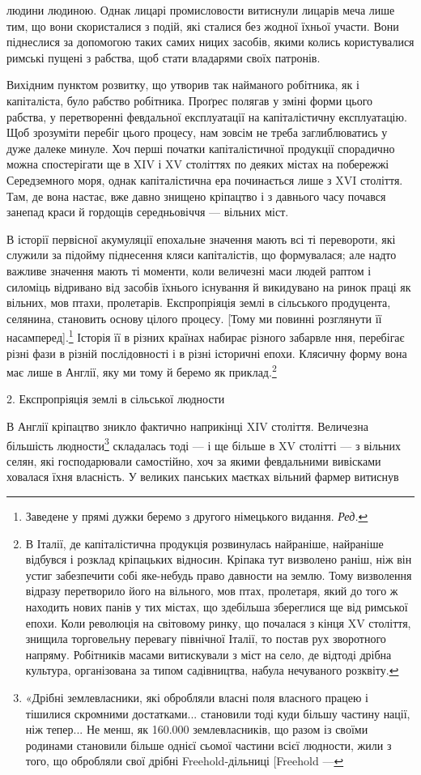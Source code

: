 людини людиною. Однак лицарі промисловости витиснули лицарів
меча лише тим, що вони скористалися з подій, які сталися
без жодної їхньої участи. Вони піднеслися за допомогою таких
самих ницих засобів, якими колись користувалися римські пущені
з рабства, щоб стати владарями своїх патронів.

Вихідним пунктом розвитку, що утворив так найманого робітника,
як і капіталіста, було рабство робітника. Проґрес полягав
у зміні форми цього рабства, у перетворенні февдальної експлуатації
на капіталістичну експлуатацію. Щоб зрозуміти перебіг
цього процесу, нам зовсім не треба заглиблюватись у дуже
далеке минуле. Хоч перші початки капіталістичної продукції
спорадично можна спостерігати ще в XIV і XV століттях по
деяких містах на побережжі Середземного моря, однак капіталістична
ера починається лише з XVI століття. Там, де вона настає,
вже давно знищено кріпацтво і з давнього часу почався
занепад краси й гордощів середньовіччя — вільних міст.

В історії первісної акумуляції епохальне значення мають всі
ті перевороти, які служили за підойму піднесення кляси капіталістів,
що формувалася; але надто важливе значення мають
ті моменти, коли величезні маси людей раптом і силоміць відривано
від засобів їхнього існування й викидувано на ринок праці
як вільних, мов птахи, пролетарів. Експропріяція землі в сільського
продуцента, селянина, становить основу цілого процесу.
[Тому ми повинні розглянути її насамперед].\footnote*{
Заведене у прямі дужки беремо з другого німецького видання. \emph{Ред.}
} Історія її в
різних країнах набирає різного забарвле ння, перебігає різні
фази в різній послідовності і в різні історичні епохи. Клясичну
форму вона має лише в Англії, яку ми тому й беремо як приклад.\footnote{
В Італії, де капіталістична продукція розвинулась найраніше,
найраніше відбувся і розклад кріпацьких відносин. Кріпака тут визволено
раніш, ніж він устиг забезпечити собі яке-небудь право давности на
землю. Тому визволення відразу перетворило його на вільного, мов
птах, пролетаря, який до того ж находить нових панів у тих містах, що
здебільша збереглися ще від римської епохи. Коли революція на світовому
ринку, що почалася з кінця XV століття, знищила торговельну
перевагу північної Італії, то постав рух зворотного напряму. Робітників
масами витискували з міст на село, де відтоді дрібна культура, організована
за типом садівництва, набула нечуваного розквіту.
}

2. Експропріяція землі в сільської людности

В Англії кріпацтво зникло фактично наприкінці XIV століття.
Величезна більшість людности\footnote{
«Дрібні землевласники, які обробляли власні поля власного працею
і тішилися скромними достатками... становили тоді куди більшу
частину нації, ніж тепер... Не менш, як 160.000 землевласників, що разом
із своїми родинами становили більше однієї сьомої частини всієї людности,
жили з того, що обробляли свої дрібні Freehold-дільниці [Freehold —
} складалась тоді — і ще
більше в XV столітті — з вільних селян, які господарювали
самостійно, хоч за якими февдальними вивісками ховалася їхня
власність. У великих панських маєтках вільний фармер витиснув
